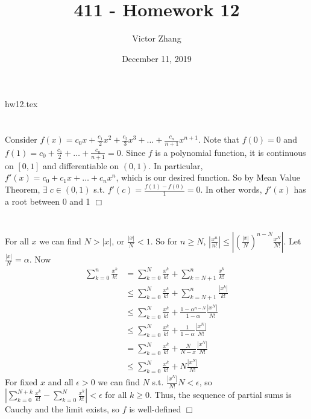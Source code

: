 hw12.tex\documentclass{article}
\title{411 - Homework 12}
\author{Victor Zhang }
\date{December 11, 2019}
\begin{document}
\maketitle

\section{}
Consider $f(x) = c_0x+\frac{c_1}{2}x^2 + \frac{c_2}{3}x^3 + \dots + \frac{c_n}{n+1}x^{n+1}$. Note that $f(0) = 0$ and $f(1) = c_0 + \frac{c_1}{2} + \dots + \frac{c_n}{n+1} = 0$. Since $f$ is a polynomial function, it is continuous on $[0,1]$ and differentiable on $(0,1)$. In particular, $f'(x) = c_0 + c_1x + \dots + c_n x^n$, which is our desired function. So by Mean Value Theorem, $\exists \; c \in (0,1)$ s.t. $f'(c) = \frac{f(1) - f(0)}{1} = 0$. In other words, $f'(x)$ has a root between 0 and 1 $\Box$

\section{}
\subsection{}
For all $x$ we can find $N>|x|$, or $\frac{|x|}{N}<1$. So for $n \geq N$, $|\frac{x^n}{n!}| \leq |{\left(\frac{|x|}{N}\right)}^{n-N} \frac{x^N}{N!}|$. Let $\frac{|x|}{N} = \alpha$. Now 
\begin{equation*}
    \begin{split}
        \sum\limits_{k=0}^{n} \frac{x^k}{k!} &= \sum\limits_{k=0}^{N} \frac{x^k}{k!} + \sum\limits_{k=N+1}^{n} \frac{x^k}{k!}\\
        &\leq \sum\limits_{k=0}^{N} \frac{x^k}{k!} + \sum\limits_{k=N+1}^{n} \frac{|x^k|}{k!}\\
        &\leq \sum\limits_{k=0}^{N} \frac{x^k}{k!} + \frac{1-\alpha^{n-N}}{1-\alpha}\frac{|x^N|}{N!}\\
        &\leq \sum\limits_{k=0}^{N} \frac{x^k}{k!} + \frac{1}{1-\alpha}\frac{|x^N|}{N!}\\
        &= \sum\limits_{k=0}^{N} \frac{x^k}{k!} + \frac{N}{N-x}\frac{|x^N|}{N!}\\
        &\leq \sum\limits_{k=0}^{N} \frac{x^k}{k!} + N\frac{|x^N|}{N!}
    \end{split}
\end{equation*}
For fixed $x$ and all $\epsilon > 0$ we can find $N$ s.t. $\frac{|x^N|}{N!}N < \epsilon$, so $|\sum\limits_{k=0}^{N+k} \frac{x^k}{k!} - \sum\limits_{k=0}^{N} \frac{x^k}{k!}| < \epsilon$ for all $k\geq0$. Thus, the sequence of partial sums is Cauchy and the limit exists, so $f$ is well-defined $\Box$
\end{document}
